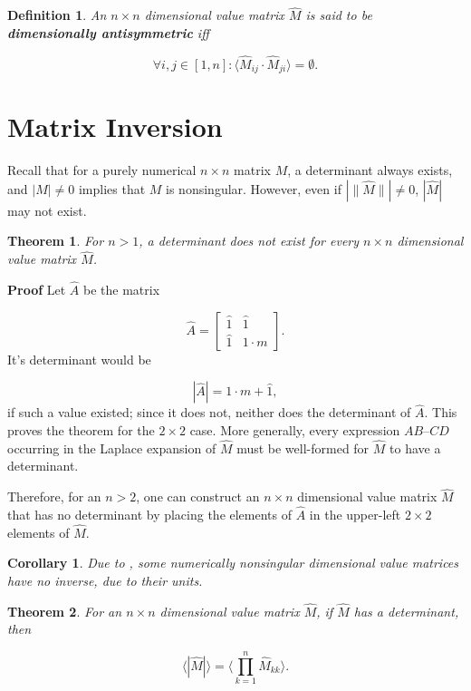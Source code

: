 \documentclass[10pt,letterpaper]{article}
\newtheorem{defn}{Definition}[section]
\newtheorem{thm}{Theorem}[section]
\newtheorem{cor}{Corollary}[section]
\newenvironment{proof}{\noindent\textbf{Proof} }{\qed \newline}
\newcommand{\qed}{\nobreak \ifvmode \relax \else
      \ifdim\lastskip<1.5em \hskip-\lastskip
      \hskip1.5em plus0em minus0.5em \fi \nobreak
      \vrule height0.75em width0.5em depth0.25em\fi}
\numberwithin{equation}{section}
\begin{document}
\begin{defn}An $n \times n$ dimensional value matrix $\hat M$ is said
  to be \textbf{dimensionally antisymmetric} iff

  \[ \forall i,j \in [1, n] : \langle \hat M_{ij} \cdot \hat M_{ji}
  \rangle = \emptyset . \] \end{defn}

\section{Matrix Inversion}

Recall that for a purely numerical $n \times n$ matrix $M$, a
determinant always exists, and $|M| \not= 0$ implies that $M$ is
nonsingular.  However, even if $| \| \hat M \| | \not= 0$, $| \hat M
|$ may not exist.

\begin{thm} \label{nonexistence_of_some_determinants} For $n > 1$,
a determinant does not exist for every $n \times n$ dimensional value
matrix $\hat M$. \end{thm}

\begin{proof}Let $\hat A$ be the matrix

\[ \hat A = \left[ \begin{matrix}
 \hat 1 & \hat 1 \\
 \hat 1 & 1 \cdot m
 \end{matrix} \right] . \] It's determinant would be

\[ | \hat A | = 1 \cdot m + \hat 1 , \] if such a value existed; since
it does not, neither does the determinant of $\hat A$.  This proves
the theorem for the $2 \times 2$ case.  More generally, every
expression $AB – CD$ occurring in the Laplace expansion of $\hat M$
must be well-formed for $\hat M$ to have a determinant.

Therefore, for an $n > 2$, one can construct an $n \times n$
dimensional value matrix $\hat M$ that has no determinant by placing
the elements of $\hat A$ in the upper-left $2 \times 2$ elements of
$\hat M$. \end{proof}

\begin{cor}Due to \label{nonexistence_of_some_determinants}, some numerically
nonsingular dimensional value matrices have no inverse, due to their
units.\end{cor}

\begin{thm}For an $n \times n$ dimensional value matrix $\hat M$, if
  $\hat M$ has a determinant, then

  \[ \langle | \hat M | \rangle = \langle \prod_{k=1}^n \hat M_{kk}
  \rangle . \]\end{thm}
\end{document}
